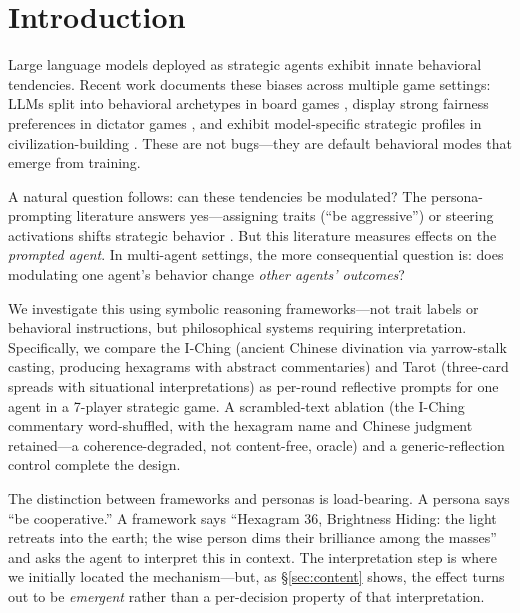 \documentclass[11pt]{article}
\begin{document}
\begin{abstract}
map corridor; a depth-matched follow-up then shows that expansion is governed by campaign memory depth, not the oracle (condition $p = 0.55$), so even this pathway is emergent rather than framework-specific. We present this as an observation paper establishing that alignment-framework choice at the agent level produces distinctive, non-additive system-level consequences in multi-agent settings, transmitted through emergent multi-agent and memory dynamics rather than the framework's per-decision effect on the receiving agent.
\end{abstract}

\section{Introduction}
\label{sec:intro}

Large language models deployed as strategic agents exhibit innate behavioral tendencies. Recent work documents these biases across multiple game settings: LLMs split into behavioral archetypes in board games \citep{Jain2026ludobench}, display strong fairness preferences in dictator games \citep{Einwiller2025dictator}, and exhibit model-specific strategic profiles in civilization-building \citep{Chen2026civbench}. These are not bugs---they are default behavioral modes that emerge from training.

A natural question follows: can these tendencies be modulated? The persona-prompting literature answers yes---assigning traits (``be aggressive'') or steering activations shifts strategic behavior \citep{Licato2025persona, Sun2026persona}. But this literature measures effects on the \emph{prompted agent}. In multi-agent settings, the more consequential question is: does modulating one agent's behavior change \emph{other agents' outcomes}?

We investigate this using symbolic reasoning frameworks---not trait labels or behavioral instructions, but philosophical systems requiring interpretation. Specifically, we compare the I-Ching (ancient Chinese divination via yarrow-stalk casting, producing hexagrams with abstract commentaries) and Tarot (three-card spreads with situational interpretations) as per-round reflective prompts for one agent in a 7-player strategic game. A scrambled-text ablation (the I-Ching commentary word-shuffled, with the hexagram name and Chinese judgment retained---a coherence-degraded, not content-free, oracle) and a generic-reflection control complete the design.

The distinction between frameworks and personas is load-bearing. A persona says ``be cooperative.'' A framework says ``Hexagram 36, Brightness Hiding: the light retreats into the earth; the wise person dims their brilliance among the masses'' and asks the agent to interpret this in context. The interpretation step is where we initially located the mechanism---but, as \S\ref{sec:content} shows, the effect turns out to be \emph{emergent} rather than a per-decision property of that interpretation.
\end{document}
